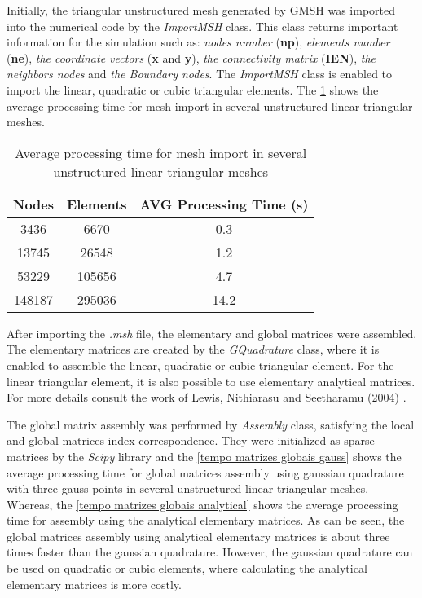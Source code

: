 \medskip
Initially, the triangular unstructured mesh generated by GMSH \cite{gmsh}
was imported into the numerical code by the \textit{ImportMSH} class.
This class returns important information for the simulation 
such as:
\textit{nodes number} (\textbf{np}), 
\textit{elements number} (\textbf{ne}), 
\textit{the coordinate vectors} (\textbf{x} and \textbf{y}), 
\textit{the connectivity matrix} (\textbf{IEN}),
\textit{the neighbors nodes} and 
\textit{the Boundary nodes}. 
The \textit{ImportMSH} class is 
enabled to import the linear, quadratic or cubic triangular elements.
The \ref{tempo malha} shows the average processing time for 
mesh import in several unstructured linear triangular meshes.

\vspace{0.5cm}
\begin{table}[H]
\caption{Average processing time for mesh import in several unstructured linear triangular meshes}
\centering
\begin{tabular}{ccc}
\toprule
\textbf{Nodes} & \textbf{Elements} & \textbf{AVG Processing Time} (s) \\
\midrule
3436 & 6670 & 0.3 \\
13745 & 26548 & 1.2 \\
53229 & 105656 & 4.7 \\
148187 & 295036 & 14.2 \\
\bottomrule
\end{tabular}
\label{tempo malha}
\end{table}

\medskip
After importing the \textit{.msh} file, the elementary and global matrices 
were assembled. 
The elementary matrices are created by the \textit{GQuadrature} class, 
where it is enabled to assemble the linear, quadratic or cubic triangular element.
For the linear 
triangular element, it is also possible to use elementary 
analytical matrices. For more details consult the work of Lewis, 
Nithiarasu and Seetharamu (2004) \cite{lewis2004}.

\medskip
The global matrix assembly was performed by \textit{Assembly} class, satisfying the local and global matrices index correspondence.
They were initialized as sparse matrices by 
the \textit{Scipy} library \cite{scipy} and 
the \ref{tempo matrizes globais gauss} shows the average processing time 
for global matrices assembly using gaussian quadrature 
with three gauss points in several unstructured linear 
triangular meshes. Whereas, the \ref{tempo matrizes globais analytical}
shows the average processing time for assembly using the analytical
elementary matrices. As can be seen,
the global matrices assembly using analytical elementary matrices is
about three times faster than the gaussian quadrature. However, the gaussian quadrature
can be used on quadratic or cubic elements, where calculating
the analytical elementary matrices is more costly.


